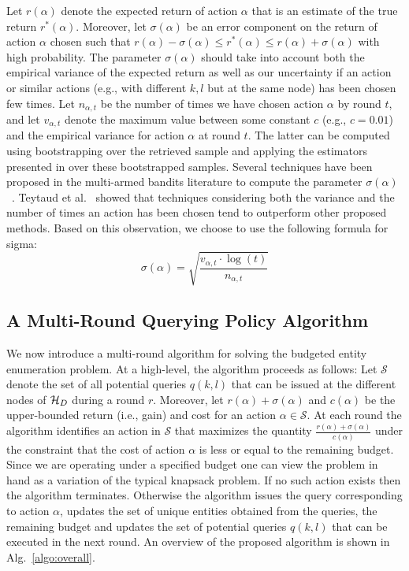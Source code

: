 Let $r(\alpha)$ denote the expected return of action $\alpha$ that is an estimate of the true return $r^*(\alpha)$. Moreover, let $\sigma(\alpha)$ be an error component on the return of action $\alpha$ chosen such that $r(\alpha) - \sigma(\alpha) \leq r^*(\alpha) \leq r(\alpha) + \sigma(\alpha)$ with high probability. The parameter $\sigma(\alpha)$ should take into account both the empirical variance of the expected return as well as our uncertainty if an action or similar actions (e.g., with different $k, l$ but at the same node) has been chosen few times. Let $n_{\alpha,t}$ be the number of times we have chosen action $\alpha$ by round $t$, and let $v_{\alpha,t}$ denote the maximum value between some constant $c$ (e.g., $c = 0.01$) and the empirical variance for action $\alpha$ at round $t$. The latter can be computed using bootstrapping over the retrieved sample and applying the estimators presented in  over these bootstrapped samples. Several techniques have been proposed in the multi-armed bandits literature to compute the parameter $\sigma(\alpha)$~\cite{teytaud:inria-00173263}. Teytaud et al.~\cite{teytaud:inria-00173263} showed that techniques considering both the variance and the number of times an action has been chosen tend to outperform other proposed methods. \iftr Based on this observation, we choose to use the following formula for sigma:
\begin{equation}
\label{eq:upper}
\sigma(\alpha) = \sqrt{\frac{v_{\alpha,t}\cdot\log(t)}{n_{\alpha,t}}}
\end{equation}
\fi

\subsection{A Multi-Round Querying Policy Algorithm}
\label{sec:heuristic}
We now introduce a multi-round algorithm for solving the budgeted entity enumeration problem. At a high-level, the algorithm proceeds as follows: Let $\mathcal{S}$ denote the set of all potential queries $q(k,l)$ that can be issued at the different nodes of $\mathcal{H}_D$ during a round $r$. Moreover, let $r(\alpha) + \sigma(\alpha)$ and $c(\alpha)$ be the upper-bounded return (i.e., gain) and cost for an action $\alpha \in \mathcal{S}$. At each round the algorithm identifies an action in $\mathcal{S}$ that maximizes the quantity $\frac{r(\alpha) + \sigma(\alpha)}{c(\alpha)}$ under the constraint that the cost of action $\alpha$ is less or equal to the remaining budget. Since we are operating under a specified budget one can view the problem in hand as a variation of the typical knapsack problem. If no such action exists then the algorithm terminates. Otherwise the algorithm issues the query corresponding to action $\alpha$, updates the set of unique entities obtained from the queries, the remaining budget and updates the set of potential queries $q(k,l)$ that can be executed in the next round.  An overview of the proposed algorithm is shown in Alg.~\ref{algo:overall}. 

